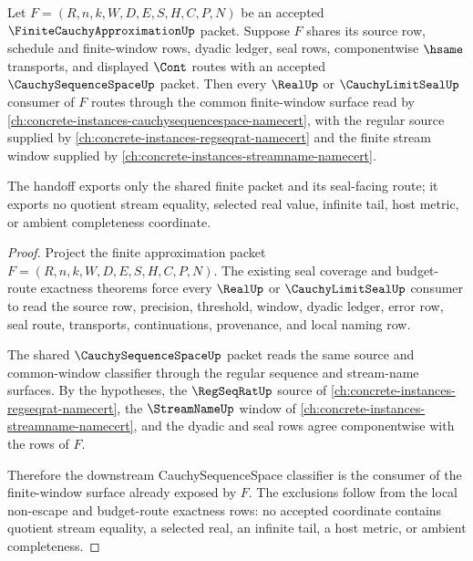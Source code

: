 \begin{theorem}
\label{thm:finite-cauchy-approximation-cauchysequence-space-handoff}
Let $F=(R,n,k,W,D,E,S,H,C,P,N)$ be an accepted $\FiniteCauchyApproximationUp$ packet. Suppose $F$ shares its source row, schedule and finite-window rows, dyadic ledger, seal rows, componentwise $\hsame$ transports, and displayed $\Cont$ routes with an accepted $\CauchySequenceSpaceUp$ packet. Then every $\RealUp$ or $\CauchyLimitSealUp$ consumer of $F$ routes through the common finite-window surface read by \autoref{ch:concrete-instances-cauchysequencespace-namecert}, with the regular source supplied by \autoref{ch:concrete-instances-regseqrat-namecert} and the finite stream window supplied by \autoref{ch:concrete-instances-streamname-namecert}.

The handoff exports only the shared finite packet and its seal-facing route; it exports no quotient stream equality, selected real value, infinite tail, host metric, or ambient completeness coordinate.
\end{theorem}
\begin{proof}
Project the finite approximation packet $F=(R,n,k,W,D,E,S,H,C,P,N)$. The existing seal coverage and budget-route exactness theorems force every $\RealUp$ or $\CauchyLimitSealUp$ consumer to read the source row, precision, threshold, window, dyadic ledger, error row, seal route, transports, continuations, provenance, and local naming row.

The shared $\CauchySequenceSpaceUp$ packet reads the same source and common-window classifier through the regular sequence and stream-name surfaces. By the hypotheses, the $\RegSeqRatUp$ source of \autoref{ch:concrete-instances-regseqrat-namecert}, the $\StreamNameUp$ window of \autoref{ch:concrete-instances-streamname-namecert}, and the dyadic and seal rows agree componentwise with the rows of $F$.

Therefore the downstream CauchySequenceSpace classifier is the consumer of the finite-window surface already exposed by $F$. The exclusions follow from the local non-escape and budget-route exactness rows: no accepted coordinate contains quotient stream equality, a selected real, an infinite tail, a host metric, or ambient completeness.
\end{proof}

